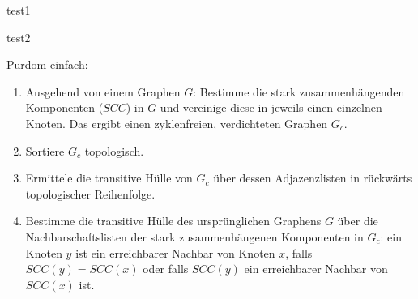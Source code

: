 \begin{minipage}[t]{.5\textwidth}
test1
\end{minipage}
\begin{minipage}[t]{.5\textwidth}
test2
\end{minipage}


\newpage

Purdom einfach:

\begin{enumerate}
\item Ausgehend von einem Graphen $G$: Bestimme die stark zusammenhängenden Komponenten ($SCC$) in $G$ und vereinige diese in jeweils einen einzelnen Knoten. Das ergibt einen zyklenfreien, verdichteten Graphen $G_c$.  %
\item Sortiere $G_c$ topologisch. %
\item Ermittele die transitive Hülle von $G_c$ über dessen Adjazenzlisten in rückwärts topologischer Reihenfolge. %
\item Bestimme die transitive Hülle des ursprünglichen Graphens $G$ über die Nachbarschaftslisten der stark zusammenhängenen Komponenten in $G_c$: ein Knoten $y$ ist ein erreichbarer Nachbar von Knoten $x$, falls $SCC(y) = SCC(x)$ oder falls $SCC(y)$ ein erreichbarer Nachbar von $SCC(x)$ ist. %
\end{enumerate}
